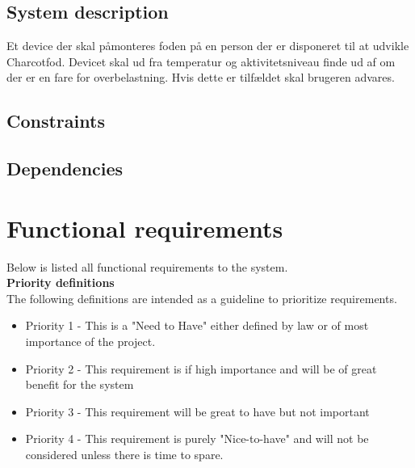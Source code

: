 \subsection{System description}
Et device der skal påmonteres foden på en person der er disponeret til at udvikle Charcotfod. Devicet skal ud fra temperatur og aktivitetsniveau finde ud af om der er en fare for overbelastning. Hvis dette er tilfældet skal brugeren advares.

\subsection{Constraints}

\subsection{Dependencies}



\section{Functional requirements}
Below is listed all functional requirements to the system.\\
\textbf{\large{Priority definitions}}\\
The following definitions are intended as a guideline to prioritize requirements.
\begin{itemize}[noitemsep,nolistsep]
\item Priority 1 - This is a "Need to Have" either defined by law or of most importance of the project.
\item Priority 2 - This requirement is if high importance and will be of great benefit for the system
\item Priority 3 - This requirement will be great to have but not important
\item Priority 4 - This requirement is purely "Nice-to-have" and will not be considered unless there is time to spare.
\end{itemize}

